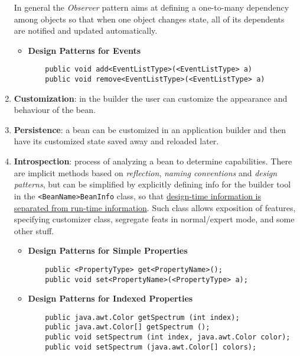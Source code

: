 \begin{enumerate}
    In general the \textit{Observer} pattern aims at defining a one-to-many dependency among objects so that when one object changes state, all of its dependents are notified and updated automatically.
    \begin{itemize}
        \item \textbf{Design Patterns for Events}
        \begin{lstlisting}
    public void add<EventListType>(<EventListType> a)
    public void remove<EventListType>(<EventListType> a)
        \end{lstlisting}
    \end{itemize}
    \item \textbf{Customization}: in the builder the user can customize the appearance and behaviour of the bean.
    \item \textbf{Persistence}: a bean can be customized in an application builder and then have its customized state saved away and reloaded later. 
    \item \textbf{Introspection}: process of analyzing a bean to determine capabilities.
    There are implicit methods based on \textit{reflection}, \textit{naming conventions} and \textit{design patterns},
    but can be simplified by explicitly defining info for the builder tool in the \lstinline{<BeanName>BeanInfo} class, so that \ul{design-time information is separated from run-time information}.
    Such class allows exposition of features, specifying customizer class, segregate feats in normal/expert mode, and some other stuff.
    \begin{itemize}
        \item \textbf{Design Patterns for Simple Properties}
        \begin{lstlisting}
    public <PropertyType> get<PropertyName>();
    public void set<PropertyName>(<PropertyType> a);
        \end{lstlisting}
        \item \textbf{Design Patterns for Indexed Properties}
        \begin{lstlisting}
    public java.awt.Color getSpectrum (int index);
    public java.awt.Color[] getSpectrum ();
    public void setSpectrum (int index, java.awt.Color color);
    public void setSpectrum (java.awt.Color[] colors);
        \end{lstlisting}
    \end{itemize}
    
\end{enumerate}
